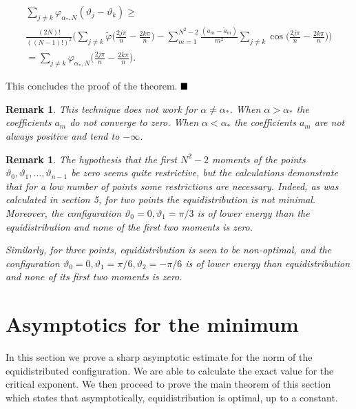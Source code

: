 \documentclass{amsart}[11pt]
\newcommand{\vphi}{\varphi}
\newcommand{\vth}{\vartheta}
\newtheorem{remark}[theorem]{Remark}
\theoremstyle{definition}
\begin{document}
\begin{gather*}
\sum_{j \neq k} \vphi_{\alpha_{\ast},N}(\vth_j - \vth_k) \geq \\ 
\frac{(2N)!}{((N-1)!)^2}\bigg( \sum_{j \neq k}\tilde{\vphi}\bigg(\frac{2j\pi}{n} - \frac{2k\pi}{n} \bigg)- \sum_{m=1}^{N^2-2}\frac{(a_m - \tilde{a}_m)}{m^2}\sum_{j \neq k}\cos\bigg(\frac{2j\pi}{n} - \frac{2k\pi}{n} \bigg) \bigg) \\
= \sum_{j \neq k}\vphi_{\alpha_{\ast},N}\bigg(\frac{2j\pi}{n} - \frac{2k\pi}{n} \bigg).
\end{gather*}

This concludes the proof of the theorem. $\hfill \blacksquare$

\begin{remark}
This technique does not work for $\alpha \neq \alpha_{\ast}$. When $\alpha> \alpha_{\ast}$ the coefficients $a_m$ do not converge to zero. When $\alpha< \alpha_{\ast}$ the coefficients $a_m$ are not always positive and tend to $-\infty$. 
\end{remark}

\begin{remark}
The hypothesis that the first $N^2-2$ moments of the points $\vth_0, \vth_1, \ldots, \vth_{n-1}$ be zero seems quite restrictive, but the calculations demonstrate that for a low number of points some restrictions are necessary. Indeed, as was calculated in section 5, for two points the equidistribution is not minimal. Moreover, the configuration $\vth_0 = 0, \vth_1 = \pi/3$ is of lower energy than the equidistribution and none of the first two moments is zero.

Similarly, for three points, equidistribution is seen to be non-optimal, and the configuration $\vth_0 = 0, \vth_1 = \pi/6, \vth_2 = -\pi/6$ is of lower energy than equidistribution and none of its first two moments is zero.
\end{remark}

\section{Asymptotics for the minimum}

In this section we prove a sharp asymptotic estimate for the norm of the equidistributed configuration. We are able to calculate the exact value for the critical exponent. We then proceed to prove the main theorem of this section which states that asymptotically, equidistribution is optimal, up to a constant.  

\vspace{2mm}
\end{document}
